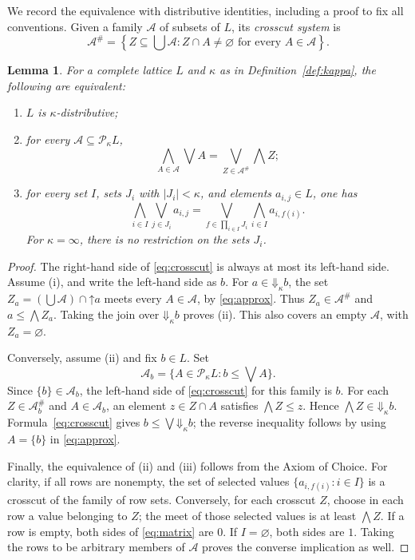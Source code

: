 \documentclass[11pt]{amsart}
\newtheorem{lemma}[theorem]{Lemma}
\theoremstyle{definition}
\theoremstyle{remark}
\numberwithin{equation}{section}
\newcommand{\PP}{\mathcal P}
\newcommand{\up}{\mathord\uparrow}
\newcommand{\DD}{\mathord\Downarrow}
\begin{document}
We record the equivalence with distributive identities, including a
proof to fix all conventions. Given a family $\mathcal A$ of subsets
of $L$, its \emph{crosscut system} is
\[
\mathcal A^{\#}
 =\left\{Z\subseteq\bigcup\mathcal A:
                 Z\cap A\ne\varnothing\text{ for every }A\in\mathcal A\right\}.
\]

\begin{lemma}\label{lem:distribution}
For a complete lattice $L$ and $\kappa$ as in
Definition~\ref{def:kappa}, the following are equivalent:
\begin{enumerate}
\item $L$ is $\kappa$-distributive;
\item for every $\mathcal A\subseteq\PP_\kappa L$,
\begin{equation}\label{eq:crosscut}
\bigwedge_{A\in\mathcal A}\bigvee A
 =\bigvee_{Z\in\mathcal A^{\#}}\bigwedge Z;
\end{equation}
\item for every set $I$, sets $J_i$ with $|J_i|<\kappa$, and
elements $a_{i,j}\in L$, one has
\begin{equation}\label{eq:matrix}
\bigwedge_{i\in I}\bigvee_{j\in J_i}a_{i,j}
 =\bigvee_{f\in\prod_{i\in I}J_i}\bigwedge_{i\in I}a_{i,f(i)}.
\end{equation}
For $\kappa=\infty$, there is no restriction on the sets $J_i$.
\end{enumerate}
\end{lemma}

\begin{proof}
The right-hand side of \eqref{eq:crosscut} is always at most its
left-hand side. Assume (i), and write the left-hand side as $b$.
For $a\in\DD_\kappa b$, the set
$Z_a=(\bigcup\mathcal A)\cap\up a$ meets every $A\in\mathcal A$,
by \eqref{eq:approx}. Thus $Z_a\in\mathcal A^\#$ and
$a\leq\bigwedge Z_a$. Taking the join over $\DD_\kappa b$ proves (ii).
This also covers an empty $\mathcal A$, with $Z_a=\varnothing$.

Conversely, assume (ii) and fix $b\in L$. Set
\[
\mathcal A_b=\{A\in\PP_\kappa L:b\leq\bigvee A\}.
\]
Since $\{b\}\in\mathcal A_b$, the left-hand side of
\eqref{eq:crosscut} for this family is $b$.
For each $Z\in\mathcal A_b^\#$ and $A\in\mathcal A_b$, an element
$z\in Z\cap A$ satisfies $\bigwedge Z\leq z$. Hence
$\bigwedge Z\in\DD_\kappa b$. Formula~\eqref{eq:crosscut} gives
$b\leq\bigvee\DD_\kappa b$; the reverse inequality follows by
using $A=\{b\}$ in \eqref{eq:approx}.

Finally, the equivalence of (ii) and (iii) follows from the Axiom of
Choice. For clarity, if all rows are nonempty, the set of selected
values $\{a_{i,f(i)}:i\in I\}$ is a crosscut of the family of row
sets. Conversely, for each crosscut $Z$, choose in each row a value
belonging to $Z$; the meet of those selected values is at least
$\bigwedge Z$. If a row is empty, both sides of
\eqref{eq:matrix} are $0$. If $I=\varnothing$, both sides are $1$.
Taking the rows to be arbitrary members of $\mathcal A$ proves
the converse implication as well.
\end{proof}
\end{document}
